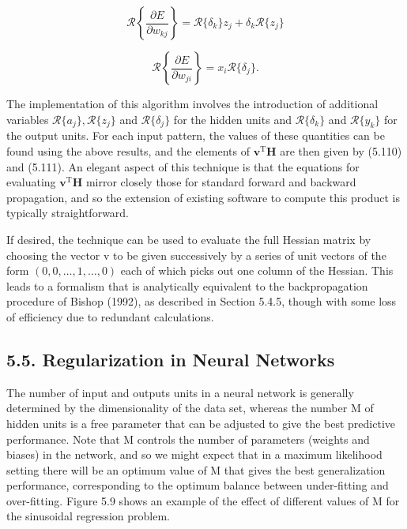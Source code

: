 \documentclass[
  10
]{article}
\begin{document}
\[
\mathcal {R} \left\{\frac {\partial E}{\partial w _ {k j}} \right\} = \mathcal {R} \{\delta_ {k} \} z _ {j} + \delta_ {k} \mathcal {R} \{z _ {j} \}\tag{5.110}
\]

\[
\mathcal {R} \left\{\frac {\partial E}{\partial w _ {j i}} \right\} = x _ {i} \mathcal {R} \{\delta_ {j} \}.\tag{5.111}
\]

The implementation of this algorithm involves the introduction of
additional variables
\(\mathcal { R } \{ a _ { j } \} , \mathcal { R } \{ z _ { j } \}\) and
\({ \mathcal { R } } \{ \delta _ { j } \}\) for the hidden units and
\(\mathcal { R } \{ \delta _ { k } \}\) and
\(\mathcal { R } \{ y _ { k } \}\) for the output units. For each input
pattern, the values of these quantities can be found using the above
results, and the elements of
\(\mathbf { v } ^ { \mathrm { T } } \mathbf { H }\) are then given by
(5.110) and (5.111). An elegant aspect of this technique is that the
equations for evaluating
\(\mathbf { v } ^ { \mathrm { T } } \mathbf { H }\) mirror closely those
for standard forward and backward propagation, and so the extension of
existing software to compute this product is typically straightforward.

If desired, the technique can be used to evaluate the full Hessian
matrix by choosing the vector v to be given successively by a series of
unit vectors of the form \(( 0 , 0 , \ldots , 1 , \ldots , 0 )\) each of
which picks out one column of the Hessian. This leads to a formalism
that is analytically equivalent to the backpropagation procedure of
Bishop (1992), as described in Section 5.4.5, though with some loss of
efficiency due to redundant calculations.

\subsection{5.5. Regularization in Neural
Networks}\label{regularization-in-neural-networks}

The number of input and outputs units in a neural network is generally
determined by the dimensionality of the data set, whereas the number M
of hidden units is a free parameter that can be adjusted to give the
best predictive performance. Note that M controls the number of
parameters (weights and biases) in the network, and so we might expect
that in a maximum likelihood setting there will be an optimum value of M
that gives the best generalization performance, corresponding to the
optimum balance between under-fitting and over-fitting. Figure 5.9 shows
an example of the effect of different values of M for the sinusoidal
regression problem.
\end{document}
